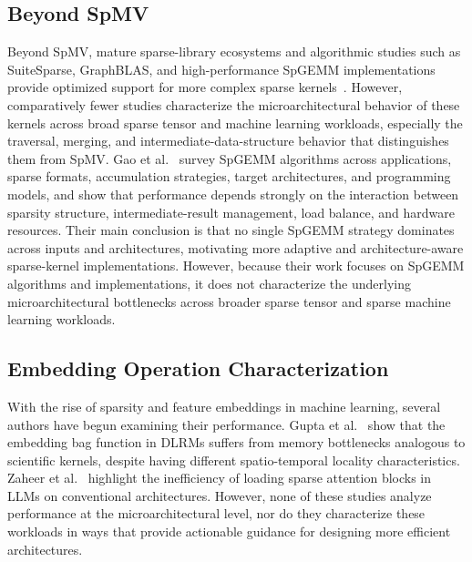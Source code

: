 \subsection{Beyond SpMV} \label{sec:related-work-beyond-spmv}
Beyond SpMV, mature sparse-library ecosystems and algorithmic studies such as SuiteSparse, GraphBLAS, and high-performance SpGEMM implementations provide optimized support for more complex sparse kernels~\cite{davis2011university,brock2022github,nagasaka2018high}. However, comparatively fewer studies characterize the microarchitectural behavior of these kernels across broad sparse tensor and machine learning workloads, especially the traversal, merging, and intermediate-data-structure behavior that distinguishes them from SpMV. Gao et al.~\cite{gao2023systematic} survey SpGEMM algorithms across applications, sparse formats, accumulation strategies, target architectures, and programming models, and show that performance depends strongly on the interaction between sparsity structure, intermediate-result management, load balance, and hardware resources. Their main conclusion is that no single SpGEMM strategy dominates across inputs and architectures, motivating more adaptive and architecture-aware sparse-kernel implementations. However, because their work focuses on SpGEMM algorithms and implementations, it does not characterize the underlying microarchitectural bottlenecks across broader sparse tensor and sparse machine learning workloads.

\subsection{Embedding Operation Characterization} \label{sec:related-work-embedding-characterization}
With the rise of sparsity and feature embeddings in machine learning, several authors have begun examining their performance. Gupta et al.~\cite{gupta2020hpca,gupta2020isca} show that the embedding bag function in DLRMs suffers from memory bottlenecks analogous to scientific kernels, despite having different spatio-temporal locality characteristics. Zaheer et al.~\cite{zaheer2020neurips} highlight the inefficiency of loading sparse attention blocks in LLMs on conventional architectures. However, none of these studies analyze performance at the microarchitectural level, nor do they characterize these workloads in ways that provide actionable guidance for designing more efficient architectures.

